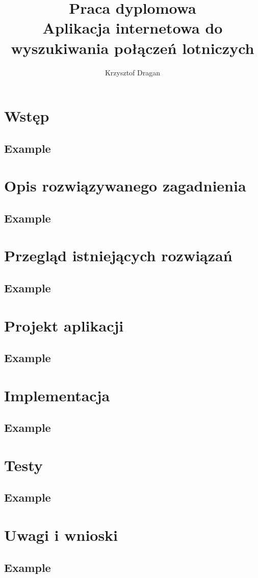 \documentclass[12pt]{extarticle}
\author{Krzysztof Dragan}
\title{%
  Praca dyplomowa \\
  \large Aplikacja internetowa do wyszukiwania połączeń lotniczych}
\newcommand\blankpage{%
	\null
    \thispagestyle{empty}%
    \newpage}
\begin{document}
  \afterpage{\blankpage}
  
  
  \afterpage{\blankpage}
  

  \afterpage{\blankpage}
  

\newpage

\tableofcontents
\newpage
	
\section{Wstęp}
	\subsection{Example}
	\newpage
	
\section{Opis rozwiązywanego zagadnienia}
\subsection{Example}
\newpage

\section{Przegląd istniejących rozwiązań}
\subsection{Example}
\newpage


\section{Projekt aplikacji}
\subsection{Example}
\newpage


\section{Implementacja}
\subsection{Example}
\newpage


\section{Testy}
\subsection{Example}
\newpage


\section{Uwagi i wnioski}
	\subsection{Example}
	\newpage





\end{document}
